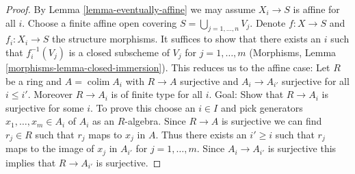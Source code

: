 \documentclass[10pt,a4paper]{amsart}
\theoremstyle{plain}
\theoremstyle{definition}
\theoremstyle{remark}
\numberwithin{equation}{subsection}
\def\colim{\mathop{\mathrm{colim}}\nolimits}
\begin{document}
\begin{proof}
By Lemma \ref{lemma-eventually-affine}
we may assume $X_i \to S$ is affine for all $i$.
Choose a finite affine open covering $S = \bigcup_{j = 1, \ldots, n} V_j$.
Denote $f : X \to S$ and $f_i : X_i \to S$ the structure morphisms.
It suffices to show that there exists an $i$ such that
$f_i^{-1}(V_j)$ is a closed subscheme of $V_j$ for $j = 1, \ldots, m$
(Morphisms, Lemma \ref{morphisms-lemma-closed-immersion}).
This reduces us to the affine case: Let $R$ be a ring and
$A = \colim A_i$ with $R \to A$ surjective and $A_i \to A_{i'}$
surjective for all $i \leq i'$. Moreover $R \to A_i$ is of finite type
for all $i$. Goal: Show that $R \to A_i$ is surjective for some $i$.
To prove this choose an $i \in I$ and pick generators
$x_1, \ldots, x_m \in A_i$ of $A_i$ as an $R$-algebra.
Since $R \to A$ is surjective we can find
$r_j \in R$ such that $r_j$ maps to $x_j$ in $A$.
Thus there exists an $i' \geq i$ such that $r_j$ maps to the image
of $x_j$ in $A_{i'}$ for $j = 1, \ldots, m$. Since $A_i \to A_{i'}$
is surjective this implies that $R \to A_{i'}$ is surjective.
\end{proof}
\end{document}
